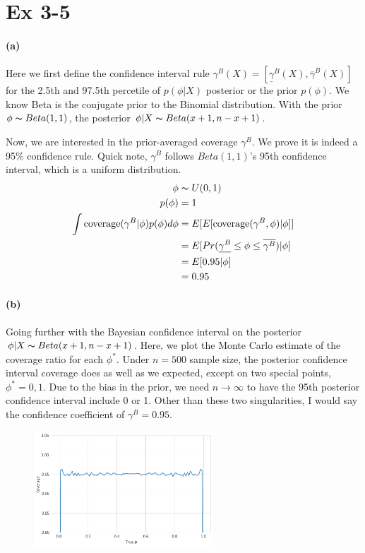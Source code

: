 \documentclass[11pt, letterpaper]{article}
\begin{document}
\newpage
\section{Ex 3-5}
\paragraph{(a)}
Here we first define the confidence interval rule $\gamma^B(X) = [\underline{\gamma}^B(X), \overline{\gamma}^B(X)]$ for the 2.5th and 97.5th percetile of $p(\phi|X)$ posterior or the prior $p(\phi)$. We know Beta is the conjugate prior to the Binomial distribution. With the prior $\phi \thicksim Beta(1, 1)$, the posterior $\phi|X \thicksim Beta(x + 1, n-x+1)$.

Now, we are interested in the prior-averaged coverage $\gamma^B$. We prove it is indeed a 95\% confidence rule. Quick note, $\gamma^B$ follows $Beta(1,1)$'s 95th confidence interval, which is a uniform distribution.
\begin{align*}
    \phi &\thicksim U(0, 1) \\
    p(\phi) &= 1 \\
    \int \text{coverage}(\gamma^B|\phi) p(\phi) d\phi
        &= E[E[\text{coverage}(\gamma^B, \phi)|\phi]] \\
        &= E[Pr(\underline{\gamma^B} \le \phi \le \overline{\gamma^B})|\phi] \\
        &= E[0.95|\phi] \\
        &= 0.95
\end{align*}

\paragraph{(b)}
Going further with the Bayesian confidence interval on the posterior $\phi|X \thicksim Beta(x+1, n-x+1)$. Here, we plot the Monte Carlo estimate of the coverage ratio for each $\phi^*$. Under $n=500$ sample size, the posterior confidence interval coverage does as well as we expected, except on two special points, $\phi^* = 0, 1$. Due to the bias in the prior, we need $n \rightarrow \infty$ to have the 95th posterior confidence interval include 0 or 1. Other than these two singularities, I would say the confidence coefficient of $\gamma^B = 0.95$.
\begin{figure}[!h]
  \centering
  \includegraphics[width=0.6\textwidth]{hw6-2.png}
  \captionsetup{justification=centering}
\end{figure}
\end{document}
